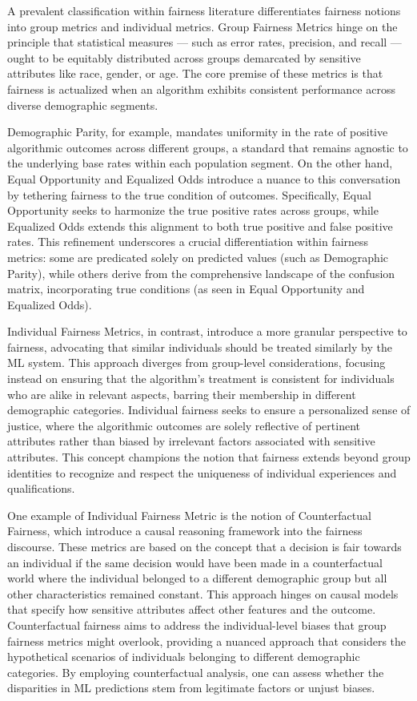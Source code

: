 A prevalent classification within fairness literature differentiates fairness notions into group metrics and individual metrics. Group Fairness Metrics hinge on the principle that statistical measures — such as error rates, precision, and recall — ought to be equitably distributed across groups demarcated by sensitive attributes like race, gender, or age. The core premise of these metrics is that fairness is actualized when an algorithm exhibits consistent performance across diverse demographic segments.

Demographic Parity, for example, mandates uniformity in the rate of positive algorithmic outcomes across different groups, a standard that remains agnostic to the underlying base rates within each population segment. On the other hand, Equal Opportunity and Equalized Odds introduce a nuance to this conversation by tethering fairness to the true condition of outcomes. Specifically, Equal Opportunity seeks to harmonize the true positive rates across groups, while Equalized Odds extends this alignment to both true positive and false positive rates. This refinement underscores a crucial differentiation within fairness metrics: some are predicated solely on predicted values (such as Demographic Parity), while others derive from the comprehensive landscape of the confusion matrix, incorporating true conditions (as seen in Equal Opportunity and Equalized Odds).

Individual Fairness Metrics, in contrast, introduce a more granular perspective to fairness, advocating that similar individuals should be treated similarly by the ML system. This approach diverges from group-level considerations, focusing instead on ensuring that the algorithm’s treatment is consistent for individuals who are alike in relevant aspects, barring their membership in different demographic categories. Individual fairness seeks to ensure a personalized sense of justice, where the algorithmic outcomes are solely reflective of pertinent attributes rather than biased by irrelevant factors associated with sensitive attributes. This concept champions the notion that fairness extends beyond group identities to recognize and respect the uniqueness of individual experiences and qualifications.

One example of Individual Fairness Metric is the notion of Counterfactual Fairness, which introduce a causal reasoning framework into the fairness discourse. These metrics are based on the concept that a decision is fair towards an individual if the same decision would have been made in a counterfactual world where the individual belonged to a different demographic group but all other characteristics remained constant. This approach hinges on causal models that specify how sensitive attributes affect other features and the outcome. Counterfactual fairness aims to address the individual-level biases that group fairness metrics might overlook, providing a nuanced approach that considers the hypothetical scenarios of individuals belonging to different demographic categories. By employing counterfactual analysis, one can assess whether the disparities in ML predictions stem from legitimate factors or unjust biases.

